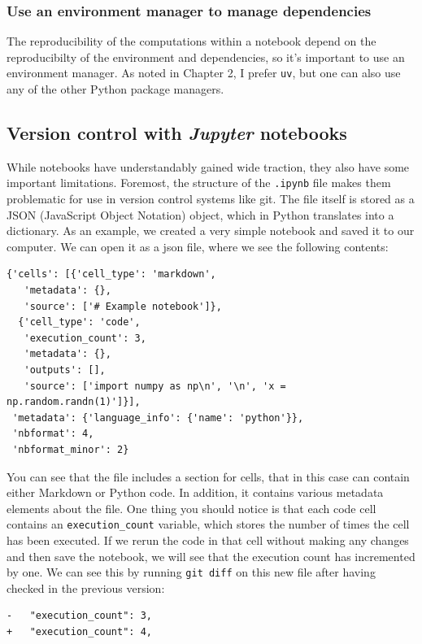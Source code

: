 \subsubsection{Use an environment manager to manage dependencies}

The reproducibility of the computations within a notebook depend on the reproducibilty of the environment and dependencies, so it's important to use an environment manager.  As noted in Chapter 2, I prefer \texttt{uv}, but one can also use any of the other Python package managers.

\subsection{Version control with \textit{Jupyter} notebooks}

While notebooks have understandably gained wide traction, they also have some important limitations.  Foremost, the structure of the \texttt{.ipynb} file makes them problematic for use in version control systems like git. The file itself is stored as a JSON (JavaScript Object Notation) object, which in Python translates into a dictionary.  As an example, we created a very simple notebook and saved it to our computer.  We can open it as a json file, where we see the following contents:

\begin{lstlisting}[style=json]
{'cells': [{'cell_type': 'markdown',
   'metadata': {},
   'source': ['# Example notebook']},
  {'cell_type': 'code',
   'execution_count': 3,
   'metadata': {},
   'outputs': [],
   'source': ['import numpy as np\n', '\n', 'x = np.random.randn(1)']}],
 'metadata': {'language_info': {'name': 'python'}},
 'nbformat': 4,
 'nbformat_minor': 2}
\end{lstlisting}

You can see that the file includes a section for cells, that in this case can contain either Markdown or Python code. In addition, it contains various metadata elements about the file. One thing you should notice is that each code cell contains an \texttt{execution\_count} variable, which stores the number of times the cell has been executed.  If we rerun the code in that cell without making any changes and then save the notebook, we will see that the execution count has incremented by one.  We can see this by running \texttt{git diff} on this new file after having checked in the previous version:

\begin{lstlisting}[style=shell]
-   "execution_count": 3,
+   "execution_count": 4,
\end{lstlisting}

